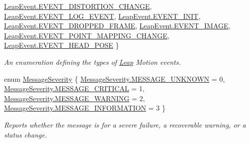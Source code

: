 \begin{DoxyCompactItemize}
\newline
\mbox{\hyperlink{namespace_leap_a5b8c8df3b9ace307e29863779a4ae85daeb25eb2024c83d7f7a9d6593a3cd65c7}{Leap\+Event.\+E\+V\+E\+N\+T\+\_\+\+D\+I\+S\+T\+O\+R\+T\+I\+O\+N\+\_\+\+C\+H\+A\+N\+GE}}, 
\mbox{\hyperlink{namespace_leap_a5b8c8df3b9ace307e29863779a4ae85dadc76090f6949be7b3d597b3ff992d4b1}{Leap\+Event.\+E\+V\+E\+N\+T\+\_\+\+L\+O\+G\+\_\+\+E\+V\+E\+NT}}, 
\mbox{\hyperlink{namespace_leap_a5b8c8df3b9ace307e29863779a4ae85dae12204b77fe354e6868610ffca266109}{Leap\+Event.\+E\+V\+E\+N\+T\+\_\+\+I\+N\+IT}}, 
\mbox{\hyperlink{namespace_leap_a5b8c8df3b9ace307e29863779a4ae85da03abd004ff86ebee3f1d8d4af76b03f6}{Leap\+Event.\+E\+V\+E\+N\+T\+\_\+\+D\+R\+O\+P\+P\+E\+D\+\_\+\+F\+R\+A\+ME}}, 
\newline
\mbox{\hyperlink{namespace_leap_a5b8c8df3b9ace307e29863779a4ae85daea5bf3924e0cb33cefa369c44af3c602}{Leap\+Event.\+E\+V\+E\+N\+T\+\_\+\+I\+M\+A\+GE}}, 
\mbox{\hyperlink{namespace_leap_a5b8c8df3b9ace307e29863779a4ae85da5b23c41e7a494d2cce3bbb55ef200cdc}{Leap\+Event.\+E\+V\+E\+N\+T\+\_\+\+P\+O\+I\+N\+T\+\_\+\+M\+A\+P\+P\+I\+N\+G\+\_\+\+C\+H\+A\+N\+GE}}, 
\mbox{\hyperlink{namespace_leap_a5b8c8df3b9ace307e29863779a4ae85da1b6b44775658c3bcf53a1dbe9141c7ba}{Leap\+Event.\+E\+V\+E\+N\+T\+\_\+\+H\+E\+A\+D\+\_\+\+P\+O\+SE}}
 \}
\begin{DoxyCompactList}\small\item\em An enumeration defining the types of \mbox{\hyperlink{namespace_leap}{Leap}} Motion events. \end{DoxyCompactList}\item 
enum \mbox{\hyperlink{namespace_leap_a4341f6495947222d3a86fcbb0c2b629d}{Message\+Severity}} \{ \mbox{\hyperlink{namespace_leap_a4341f6495947222d3a86fcbb0c2b629da29fc8bf024918f353656bae2c00e5789}{Message\+Severity.\+M\+E\+S\+S\+A\+G\+E\+\_\+\+U\+N\+K\+N\+O\+WN}} = 0, 
\mbox{\hyperlink{namespace_leap_a4341f6495947222d3a86fcbb0c2b629da15ad4f20fffc0bd98bc88fa1f42478fa}{Message\+Severity.\+M\+E\+S\+S\+A\+G\+E\+\_\+\+C\+R\+I\+T\+I\+C\+AL}} = 1, 
\mbox{\hyperlink{namespace_leap_a4341f6495947222d3a86fcbb0c2b629da84661d7e9b633da9741ae087054679de}{Message\+Severity.\+M\+E\+S\+S\+A\+G\+E\+\_\+\+W\+A\+R\+N\+I\+NG}} = 2, 
\mbox{\hyperlink{namespace_leap_a4341f6495947222d3a86fcbb0c2b629dafebc5e4212df70823439719d329e0b52}{Message\+Severity.\+M\+E\+S\+S\+A\+G\+E\+\_\+\+I\+N\+F\+O\+R\+M\+A\+T\+I\+ON}} = 3
 \}
\begin{DoxyCompactList}\small\item\em Reports whether the message is for a severe failure, a recoverable warning, or a status change. \end{DoxyCompactList}\end{DoxyCompactItemize}


